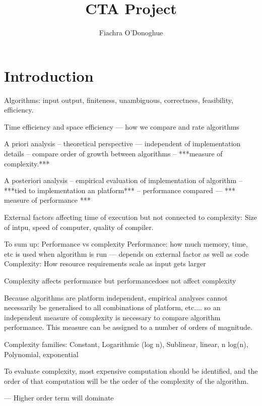 \documentclass[12pt, a4paper]{article}
\title{CTA Project}
\author{Fiachra O'Donoghue}
\begin{document}
    
\section{Introduction}


Algorithms: input output, finiteness, unambiguous, correctness, feasibility, efficiency.

Time efficiency and space efficiency --- how we compare and rate algorithms

A priori analysis -- theoretical perspective --- independent of implementation details -- compare order of growth between algorithms -- ***measure of complexity.***

A posteriori analysis -- empirical evaluation of implementation of  algorithm -- ***tied to implementation an platform*** -- performance compared --- *** measure of performance ***

External factors affecting time of execution but not connected to complexity:
Size of intpu, speed of computer, quality of compiler.

To sum up: Performance vs complexity
Performance: how much memory, time, etc is used when algorithm is run --- depends on external factor as well as code 
Complexity: How resource requirements scale as input gets larger

Complexity affects performance but performancedoes not affect complexity

Because algorithms are platform independent, empirical analyses cannot necessarily be generalised to all combinations of platform, etc.... so an independent measure of complexity is necessary to compare algorithm performance. This measure can be assigned to a number of orders of magnitude. 

Complexity families:
    Constant, Logarithmic (log n), Sublinear, linear, n log(n), Polynomial, exponential

To evaluate complexity, most expensive computation should be identified, and the order of that computation will be the order of the complexity of the algorithm.

--- Higher order term will dominate 
\end{document}
